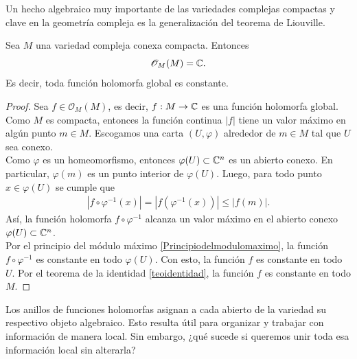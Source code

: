 Un hecho algebraico muy importante de las variedades complejas compactas y clave en la geometría compleja es la generalización del teorema de Liouville.

\begin{theorem}\label{holomorfasglobal}
	Sea $M$ una variedad compleja conexa compacta. Entonces
	\begin{equation*}
		\mathscr{O}_M(M)=\mathbb{C}.
	\end{equation*}
	Es decir, toda función holomorfa global es constante. 
\end{theorem}
\begin{proof}
	Sea $f\in \mathscr{O}_M(M)$, es decir, $f:M\to\mathbb{C}$ es una función holomorfa global.
	Como $M$ es compacta, entonces la función continua $|f|$ tiene un valor máximo en algún punto $m\in M$.
	Escogamos una carta $(U,\varphi)$ alrededor de $m\in M$ tal que $U$ sea conexo.\\
	Como $\varphi$ es un homeomorfismo, entonces $\varphi(U)\subset\mathbb{C}^n$ es un abierto conexo. En particular, $\varphi(m)$ es un punto interior de $\varphi(U)$. Luego, para todo punto $x\in \varphi(U)$ se cumple que
	\begin{align*}
		|f\circ \varphi^{-1}(x)|=|f(\varphi^{-1}(x))|\leq |f(m)|.
	\end{align*}
	Así, la función holomorfa $f\circ\varphi^{-1}$ alcanza un valor máximo en el abierto conexo $\varphi(U)\subset\mathbb{C}^n$.\\
	Por el principio del módulo máximo \ref{Principiodelmodulomaximo}, la función $f\circ\varphi^{-1}$ es constante en todo $\varphi(U)$. Con esto, la función $f$ es constante en todo $U$. Por el teorema de la identidad \ref{teoidentidad}, la función $f$ es constante en todo $M$.
\end{proof}

Los anillos de funciones holomorfas asignan a cada abierto de la variedad su respectivo objeto algebraico. Esto resulta útil para organizar y trabajar con información de manera local. Sin embargo, ¿qué sucede si queremos unir toda esa información local sin alterarla?